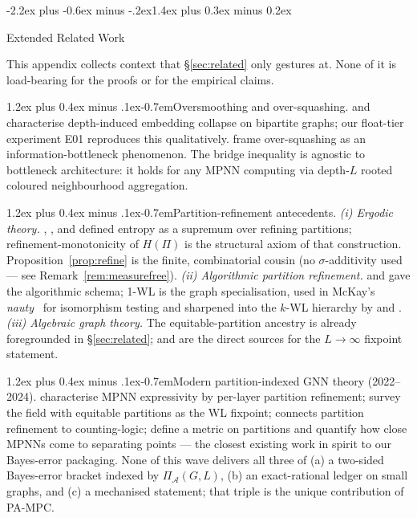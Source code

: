 \documentclass[10pt]{article}
\makeatletter
\def\section{\@startsection{section}{1}{\z@}%
  {-2.2ex plus -0.6ex minus -.2ex}{1.4ex plus 0.3ex minus 0.2ex}%
  {\normalsize\bf\raggedright\sffamily}}
\def\paragraph{\@startsection{paragraph}{4}{\z@}%
  {1.2ex plus 0.4ex minus .1ex}{-0.7em}{\normalsize\bf}}
\theoremstyle{definition}
\theoremstyle{remark}
\newcommand{\PiA}{\Pi_{\mathcal{A}}}
\makeatother
\begin{document}
\section{Extended Related Work}\label{app:extrelated}

This appendix collects context that \S\ref{sec:related} only
gestures at. None of it is load-bearing for the proofs or for the
empirical claims.

\paragraph{Oversmoothing and over-squashing.} \citet{cai2020oversmooth}
and \citet{oono2020graph} characterise depth-induced embedding
collapse on bipartite graphs; our float-tier experiment E01
reproduces this qualitatively. \citet{alon2021bottleneck} frame
over-squashing as an information-bottleneck phenomenon. The bridge
inequality is agnostic to bottleneck architecture: it holds for any
MPNN computing via depth-$L$ rooted coloured neighbourhood
aggregation.

\paragraph{Partition-refinement antecedents.}
\textit{(i) Ergodic theory.} \citet{kolmogorov1958},
\citet{sinai1959}, and \citet{rokhlin1967} defined entropy as a
supremum over refining partitions; refinement-monotonicity of
$H(\Pi)$ is the structural axiom of that construction.
Proposition~\ref{prop:refine} is the finite, combinatorial cousin
(no $\sigma$-additivity used --- see Remark~\ref{rem:measurefree}).
\textit{(ii) Algorithmic partition refinement.} \citet{hopcroft1971}
and \citet{paige1987} gave the algorithmic schema; 1-WL is the
graph specialisation, used in McKay's \emph{nauty}~\citep{mckay1981}
for isomorphism testing and sharpened into the $k$-WL hierarchy
by \citet{caifurer1992} and \citet{grohe2017}.
\textit{(iii) Algebraic graph theory.} The equitable-partition
ancestry is already foregrounded in \S\ref{sec:related};
\citet{schwenk1974} and \citet[ch.~9]{godsil2001ag} are the direct
sources for the $L \to \infty$ fixpoint statement.

\paragraph{Modern partition-indexed GNN theory (2022--2024).}
\citet{geerts2022} characterise MPNN expressivity by per-layer
partition refinement; \citet{morris2023survey} survey the field
with equitable partitions as the WL fixpoint;
\citet{grohe2021logic} connects partition refinement to
counting-logic; \citet{boker2024finegrained} define a metric on
partitions and quantify how close MPNNs come to separating points
--- the closest existing work in spirit to our Bayes-error
packaging. None of this wave delivers all three of (a) a
two-sided Bayes-error bracket indexed by $\PiA(G, L)$, (b) an
exact-rational ledger on small graphs, and (c) a mechanised
statement; that triple is the unique contribution of PA-MPC.
\end{document}
